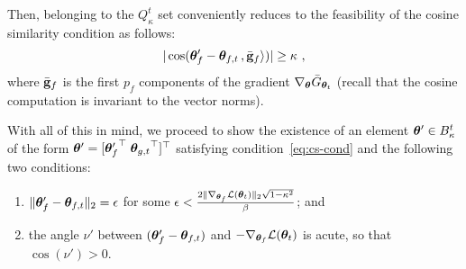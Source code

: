 Then, belonging to the $Q_\kappa^t$ set conveniently reduces to the feasibility of the cosine similarity condition as follows: 
\begin{align}
\label{eq:cs-cond}
  |\cos({\bm{\theta}}'_f-{\bm{\theta}}_{f,t}\,, \bar{\mathbf{g}}_f \rangle)| \geq \kappa~,
\end{align}
where $\bar{\mathbf{g}}_f$ is the first $p_f$ components of the gradient $\nabla_{{\bm{\theta}}}\bar{G}_{{\bm{\theta}}_t}$ (recall that the cosine computation is invariant to the vector norms).
%
%
%
%
%
%

With all of this in mind, we proceed to show the existence of an element ${\bm{\theta}}' \in B^t_{\kappa}$ of the form ${\bm{\theta}}'=[{{\bm{\theta}}'_f}^{\top}\;{{\bm{\theta}}_{g,t}}^{\top}]^{\top}$ 
%
%
satisfying condition~\eqref{eq:cs-cond} and the following two conditions:
\begin{enumerate}[{Condition} (A):]%
\item  $\|{\bm{\theta}}'_f - {\bm{\theta}}_{f,t} \|_2 = \epsilon$ for some $\epsilon< \frac{2 \lVert\nabla_{{\bm{\theta}}_f} {\cal L}({\bm{\theta}}_t)\rVert_2 \sqrt{1-\kappa^2}}{\beta}$; and \label{cond-1-don}
\item the angle $\nu'$ between $({\bm{\theta}}'_f - {\bm{\theta}}_{f,t})$ and $-\nabla_{{\bm{\theta}}_f} {\cal L}({\bm{\theta}}_t)$ is acute, so that $\cos(\nu') > 0$. \label{cond-2-don}\end{enumerate}
%

